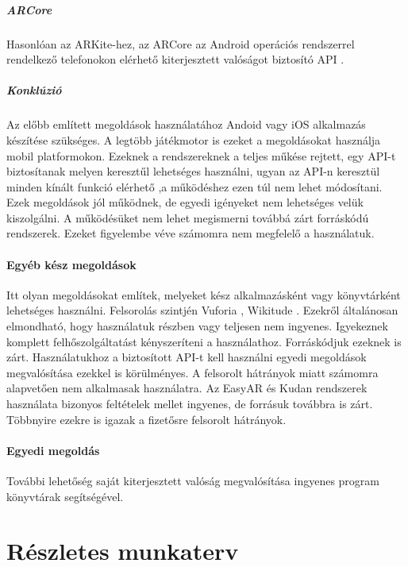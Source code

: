 \documentclass[12pt,a4paper,oneside]{report} %
\begin{document}
\paragraph{ARCore}
Hasonlóan az ARKite-hez, az ARCore az Android operációs rendszerrel rendelkező telefonokon elérhető kiterjesztett valóságot biztosító API \cite{arcore}.
\paragraph{Konklúzió}
Az előbb említett megoldások használatához Andoid vagy iOS alkalmazás készítése szükséges. A legtöbb játékmotor is ezeket a megoldásokat használja mobil platformokon. Ezeknek a rendszereknek a teljes műkése rejtett, egy API-t biztosítanak melyen keresztűl lehetséges használni, ugyan az API-n keresztül minden kínált funkció elérhető ,a működéshez ezen túl nem lehet módosítani. Ezek megoldások jól működnek, de egyedi igényeket nem lehetséges velük kiszolgálni. A működésüket nem lehet megismerni továbbá zárt forráskódú rendszerek. Ezeket figyelembe véve számomra nem megfelelő a használatuk.
\subsubsection{Egyéb kész megoldások}
Itt olyan megoldásokat említek, melyeket kész alkalmazásként vagy könyvtárként lehetséges használni. Felsorolás szintjén  Vuforia \cite{vuforia}, Wikitude \cite{wikitude}.
Ezekről általánosan elmondható, hogy használatuk részben vagy teljesen nem ingyenes. Igyekeznek komplett felhőszolgáltatást kényszeríteni a használathoz. Forráskódjuk ezeknek is zárt. Használatukhoz a biztosított API-t kell használni egyedi megoldások megvalósítása ezekkel is körülményes.  A felsorolt hátrányok miatt számomra alapvetően nem alkalmasak használatra.
Az EasyAR \cite{ezar} és Kudan \cite{kudan} rendszerek használata bizonyos feltételek mellet ingyenes, de forrásuk továbbra is zárt. Többnyire ezekre is igazak a  fizetősre felsorolt hátrányok.

\subsubsection{Egyedi megoldás}
További lehetőség saját kiterjesztett valóság megvalósítása ingyenes program könyvtárak segítségével. 


\chapter{Részletes munkaterv}
\end{document}
